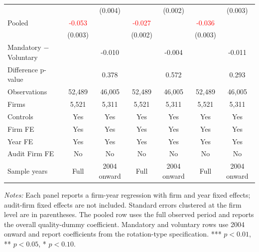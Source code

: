\begin{table}[htbp]
\begin{threeparttable}
{\begin{tabular}{l cc cc cc}
 &  & (0.004) &  & (0.002) &  & (0.003) \\
Pooled & \textcolor{red}{-0.053\sym{***}} &  & \textcolor{red}{-0.027\sym{***}} &  & \textcolor{red}{-0.036\sym{***}} &  \\
 & (0.003) &  & (0.002) &  & (0.003) &  \\
Mandatory $-$ Voluntary &  & -0.010 &  & -0.004 &  & -0.011 \\
Difference p-value &  & 0.378 &  & 0.572 &  & 0.293 \\
Observations & 52,489 & 46,005 & 52,489 & 46,005 & 52,489 & 46,005 \\
Firms & 5,521 & 5,311 & 5,521 & 5,311 & 5,521 & 5,311 \\
\midrule
Controls & Yes & Yes & Yes & Yes & Yes & Yes \\
Firm FE & Yes & Yes & Yes & Yes & Yes & Yes \\
Year FE & Yes & Yes & Yes & Yes & Yes & Yes \\
Audit Firm FE & No & No & No & No & No & No \\
Sample years & Full & 2004 onward & Full & 2004 onward & Full & 2004 onward \\
\bottomrule
\end{tabular}}
\begin{tablenotes}\footnotesize
\item \textit{Notes:} Each panel reports a firm-year regression with firm and year fixed effects; audit-firm fixed effects are not included. Standard errors clustered at the firm level are in parentheses. The pooled row uses the full observed period and reports the overall quality-dummy coefficient. Mandatory and voluntary rows use 2004 onward and report coefficients from the rotation-type specification. *** \(p<0.01\), ** \(p<0.05\), * \(p<0.10\).
\end{tablenotes}
\end{threeparttable}
\end{table}
